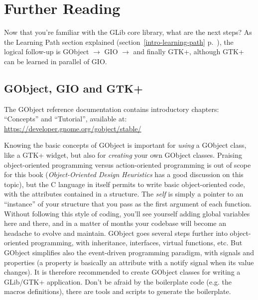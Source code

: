 \chapter{Further Reading}
\label{further-reading}

Now that you're familiar with the GLib core library, what are the next steps? As the Learning Path section explained (section~\ref{intro-learning-path} p.~\pageref{intro-learning-path}), the logical follow-up is GObject $\rightarrow$ GIO $\rightarrow$ and finally GTK+, although GTK+ can be learned in parallel of GIO.

\section{GObject, GIO and GTK+}

The GObject reference documentation contains introductory chapters: ``Concepts'' and ``Tutorial'', available at:\\
\url{https://developer.gnome.org/gobject/stable/}

Knowing the basic concepts of GObject is important for \emph{using} a GObject class, like a GTK+ widget, but also for \emph{creating} your own GObject classes. Praising object-oriented programming versus action-oriented programming is out of scope for this book (\emph{Object-Oriented Design Heuristics} \cite{oop-book} has a good discussion on this topic), but the C language in itself permits to write basic object-oriented code, with the attributes contained in a structure. The \emph{self} is simply a pointer to an ``instance'' of your structure that you pass as the first argument of each function. Without following this style of coding, you'll see yourself adding global variables here and there, and in a matter of months your codebase will become an headache to evolve and maintain. GObject goes several steps further into object-oriented programming, with inheritance, interfaces, virtual functions, etc. But GObject simplifies also the event-driven programming paradigm, with signals and properties (a property is basically an attribute with a notify signal when its value changes). It is therefore recommended to create GObject classes for writing a GLib/GTK+ application. Don't be afraid by the boilerplate code (e.g. the macros definitions), there are tools and scripts to generate the boilerplate.

